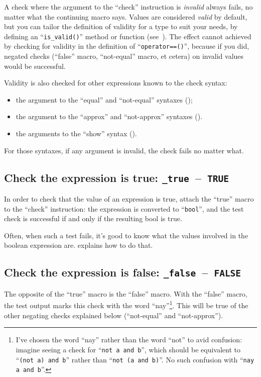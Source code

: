 \documentclass[twoside, a4paper, article]{memoir}
\newcommand*\testudocolor{\color{red!80!blue}}
\newcommand*\testudo[1]{\texttt{\testudocolor{}#1}}
\newcommand*\testudopair[2]{\testudo{#1}~--~\testudo{#2}}
\newcommand\subsectiontestudopair[3]{%
  \subsection[#1]{#1: \testudopair{#2}{#3}}}
\newcommand\typesetexampleandreport[1]{%
  \typesetexamplesource{#1}
  \typesetexamplereport{#1}
}
\providecommand\typesetexamplereport[1]{%
}
\providecommand\typesetexamplesource[1]{%
}
\begin{document}
A check where the argument to the ``check'' instruction is \emph{invalid}
always fails, no matter what the continuing macro says.  Values are considered
\emph{valid} by default, but you can tailor the definition of validity for a
type to suit your needs, by defining an ``\texttt{is\_valid()}'' method or
function (see~).  The effect cannot achieved by checking for
validity in the definition of ``\texttt{operator==()}'', because if you did,
negated checks (``false'' macro, ``not-equal'' macro, et cetera) on invalid
values would be successful.

Validity is also checked for other expressions known to the check syntax:
\begin{itemize}
\item the argument to the ``equal'' and ``not-equal'' syntaxes
  ();
\item the argument to the ``approx'' and ``not-approx'' syntaxes
  ().
\item the arguments to the ``show'' syntax
  ().
\end{itemize}
For those syntaxes, if any argument is invalid, the check fails no matter what.

\subsectiontestudopair{Check the expression is true}{\_true}{TRUE}
\label{sec:check-expression-true}

In order to check that the value of an expression is true, attach the ``true''
macro to the ``check'' instruction: the expression is converted to
``\texttt{bool}'', and the test check is successful if and only if the
resulting bool is true.

\typesetexampleandreport{check-true}

Often, when such a test fails, it's good to know what the values involved in
the boolean expression are.   explains how
to do that.

\subsectiontestudopair{Check the expression is false}{\_false}{FALSE}
\label{sec:check-expression-false}

The opposite of the ``true'' macro is the ``false'' macro.  With the ``false''
macro, the test output marks this check with the word ``nay''\footnote{I've
  chosen the word ``nay'' rather than the word ``not'' to avid confusion:
  imagine seeing a check for ``\texttt{not a and b}'', which should be
  equivalent to ``\texttt{(not a) and b}'' rather than ``\texttt{not (a and
    b)}''.  No such confusion with ``\texttt{nay a and b}''.}.  This will be
true of the other negating checks explained below (``not-equal'' and
``not-approx'').
\end{document}
